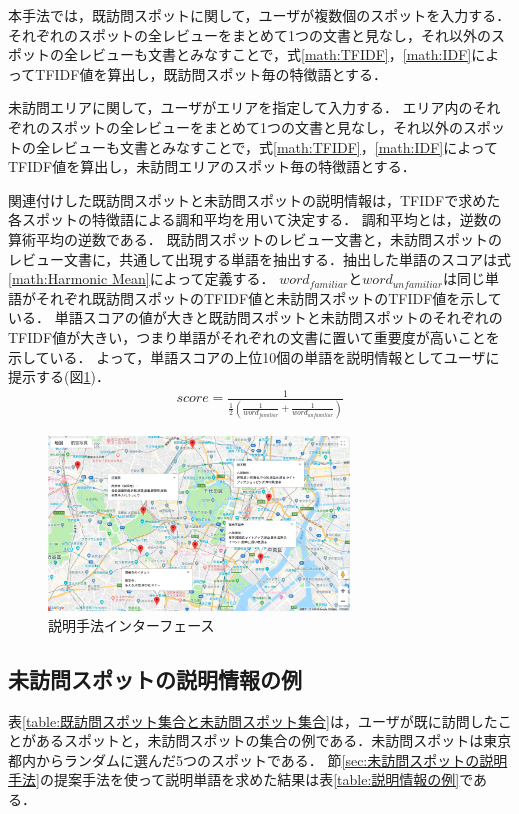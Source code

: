 \documentclass{deimj}
\begin{document}
本手法では，既訪問スポットに関して，ユーザが複数個のスポットを入力する．
それぞれのスポットの全レビューをまとめて1つの文書と見なし，それ以外のスポットの全レビューも文書とみなすことで，式\ref{math:TFIDF}，\ref{math:IDF}によってTFIDF値を算出し，既訪問スポット毎の特徴語とする．

未訪問エリアに関して，ユーザがエリアを指定して入力する．
エリア内のそれぞれのスポットの全レビューをまとめて1つの文書と見なし，それ以外のスポットの全レビューも文書とみなすことで，式\ref{math:TFIDF}，\ref{math:IDF}によってTFIDF値を算出し，未訪問エリアのスポット毎の特徴語とする．

関連付けした既訪問スポットと未訪問スポットの説明情報は，TFIDFで求めた各スポットの特徴語による調和平均を用いて決定する．
調和平均とは，逆数の算術平均の逆数である．
既訪問スポットのレビュー文書と，未訪問スポットのレビュー文書に，共通して出現する単語を抽出する．抽出した単語のスコアは式\ref{math:Harmonic Mean}によって定義する．
$word_{familiar}$と$word_{unfamiliar}$は同じ単語がそれぞれ既訪問スポットのTFIDF値と未訪問スポットのTFIDF値を示している．
単語スコアの値が大きと既訪問スポットと未訪問スポットのそれぞれのTFIDF値が大きい，つまり単語がそれぞれの文書に置いて重要度が高いことを示している．
よって，単語スコアの上位10個の単語を説明情報としてユーザに提示する(図\ref{fig:photo_map})．
\begin{eqnarray}
  score=\frac{1}{\frac{1}{2}(\frac{1}{word_{familiar}}+\frac{1}{word_{unfamiliar}})}
  \label{math:Harmonic Mean}
\end{eqnarray}

\begin{figure}[t]
  \begin{center}
    \includegraphics[clip,width=8.0cm]{picture/Photo_map.png}
    \caption{説明手法インターフェース}
    \label{fig:photo_map}
   \end{center}
\end{figure}

\subsection{未訪問スポットの説明情報の例}
\label{subsec:未訪問スポットの説明情報の例}
表\ref{table:既訪問スポット集合と未訪問スポット集合}は，ユーザが既に訪問したことがあるスポットと，未訪問スポットの集合の例である．未訪問スポットは東京都内からランダムに選んだ5つのスポットである．
節\ref{sec:未訪問スポットの説明手法}の提案手法を使って説明単語を求めた結果は表\ref{table:説明情報の例}である．
\end{document}
